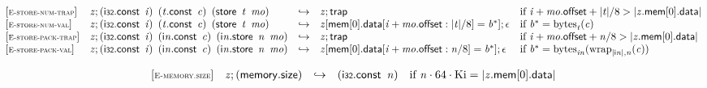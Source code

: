 $$
\begin{array}{@{}l@{}lcl@{}l@{}}
{[\textsc{\scriptsize E{-}store{-}num{-}trap}]} \quad & {\mathit{z}} ; (\mathsf{i{\scriptstyle32}}.\mathsf{const}~\,{\mathit{i}})~\,({\mathit{t}}.\mathsf{const}~\,{\mathit{c}})~\,(\mathsf{store}~\,{\mathit{t}}~\,{\mathit{mo}}) &\hookrightarrow& {\mathit{z}} ; \mathsf{trap} &\quad
  \mbox{if}~{\mathit{i}} + {\mathit{mo}}.\mathsf{offset} + {|{\mathit{t}}|} / 8 > {|{{\mathit{z}}.\mathsf{mem}}{{}[0]}.\mathsf{data}|} \\
{[\textsc{\scriptsize E{-}store{-}num{-}val}]} \quad & {\mathit{z}} ; (\mathsf{i{\scriptstyle32}}.\mathsf{const}~\,{\mathit{i}})~\,({\mathit{t}}.\mathsf{const}~\,{\mathit{c}})~\,(\mathsf{store}~\,{\mathit{t}}~\,{\mathit{mo}}) &\hookrightarrow& {\mathit{z}}{}[\mathsf{mem}{}[0].\mathsf{data}{}[{\mathit{i}} + {\mathit{mo}}.\mathsf{offset} : {|{\mathit{t}}|} / 8] = {{\mathit{b}}^\ast}] ; \epsilon &\quad
  \mbox{if}~{{\mathit{b}}^\ast} = {{\mathrm{bytes}}}_{{\mathit{t}}}({\mathit{c}}) \\
{[\textsc{\scriptsize E{-}store{-}pack{-}trap}]} \quad & {\mathit{z}} ; (\mathsf{i{\scriptstyle32}}.\mathsf{const}~\,{\mathit{i}})~\,({\mathsf{i}}{{\mathit{n}}}.\mathsf{const}~\,{\mathit{c}})~\,({\mathsf{i}}{{\mathit{n}}}.\mathsf{store}~\,{\mathit{n}}~\,{\mathit{mo}}) &\hookrightarrow& {\mathit{z}} ; \mathsf{trap} &\quad
  \mbox{if}~{\mathit{i}} + {\mathit{mo}}.\mathsf{offset} + {\mathit{n}} / 8 > {|{{\mathit{z}}.\mathsf{mem}}{{}[0]}.\mathsf{data}|} \\
{[\textsc{\scriptsize E{-}store{-}pack{-}val}]} \quad & {\mathit{z}} ; (\mathsf{i{\scriptstyle32}}.\mathsf{const}~\,{\mathit{i}})~\,({\mathsf{i}}{{\mathit{n}}}.\mathsf{const}~\,{\mathit{c}})~\,({\mathsf{i}}{{\mathit{n}}}.\mathsf{store}~\,{\mathit{n}}~\,{\mathit{mo}}) &\hookrightarrow& {\mathit{z}}{}[\mathsf{mem}{}[0].\mathsf{data}{}[{\mathit{i}} + {\mathit{mo}}.\mathsf{offset} : {\mathit{n}} / 8] = {{\mathit{b}}^\ast}] ; \epsilon &\quad
  \mbox{if}~{{\mathit{b}}^\ast} = {{\mathrm{bytes}}}_{{{\mathit{i}}}{{\mathit{n}}}}({{{\mathrm{wrap}}}_{{|{\mathsf{i}}{{\mathit{n}}}|}, {\mathit{n}}}}{({\mathit{c}})}) \\
\end{array}
$$

\vspace{1ex}

$$
\begin{array}{@{}l@{}lcl@{}l@{}}
{[\textsc{\scriptsize E{-}memory.size}]} \quad & {\mathit{z}} ; (\mathsf{memory.size}) &\hookrightarrow& (\mathsf{i{\scriptstyle32}}.\mathsf{const}~\,{\mathit{n}}) &\quad
  \mbox{if}~{\mathit{n}} \cdot 64 \cdot {\mathrm{Ki}} = {|{{\mathit{z}}.\mathsf{mem}}{{}[0]}.\mathsf{data}|} \\
\end{array}
$$

